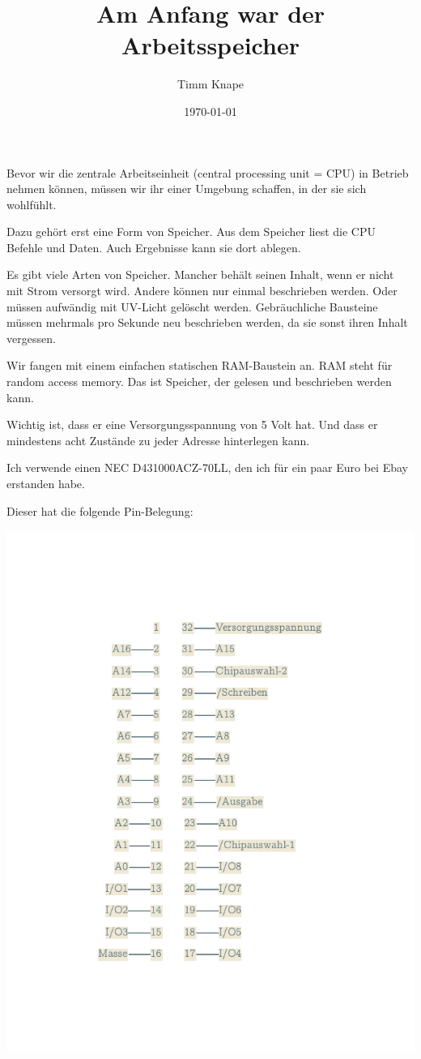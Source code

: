 \documentclass[a5paper,ngerman]{article}
\title{\color{emph}Am Anfang war der Arbeitsspeicher}
\author{Timm Knape}
\date{\today}
\begin{document}
\pagecolor{background}
\color{normal}
\allsectionsfont{\color{emph}\mdseries}
\pagestyle{plain}
\maketitle
\thispagestyle{fancy}

Bevor wir die zentrale Arbeitseinheit (central processing unit = CPU)
in Betrieb nehmen können,
müssen wir ihr einer Umgebung schaffen, in der sie sich wohlfühlt.

Dazu gehört erst eine Form von Speicher.
Aus dem Speicher liest die CPU Befehle und Daten.
Auch Ergebnisse kann sie dort ablegen.

Es gibt viele Arten von Speicher.
Mancher behält seinen Inhalt, wenn er nicht mit Strom versorgt wird.
Andere können nur einmal beschrieben werden.
Oder müssen aufwändig mit UV-Licht gelöscht werden.
Gebräuchliche Bausteine müssen mehrmals pro Sekunde neu beschrieben
werden, da sie sonst ihren Inhalt vergessen.

Wir fangen mit einem einfachen statischen RAM-Baustein an.
RAM steht für random access memory.
Das ist Speicher, der gelesen und beschrieben werden kann.

Wichtig ist, dass er eine Versorgungsspannung von 5 Volt hat.
Und dass er mindestens acht Zustände zu jeder Adresse hinterlegen kann.

Ich verwende einen NEC D431000ACZ-70LL, den ich für ein paar Euro bei
Ebay erstanden habe.

Dieser hat die folgende Pin-Belegung:

\centerline{\includegraphics[trim={1in .9in 1in .9in},clip]{imgs/dot-1-light.pdf}}
\end{document}
